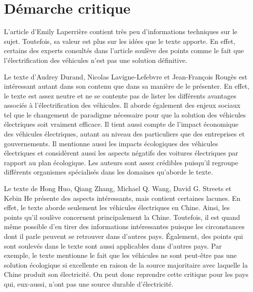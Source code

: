 
\chapter{Démarche critique}

L'article  d'Emily Laperrière contient très peu d'informations techniques sur le sujet. Toutefois, sa valeur est plus sur les idées que le texte apporte. En effet, certains des experts consultés dans l'article soulève des points comme le fait que l'électrification des véhicules n'est pas une solution définitive. 

Le texte  d'Audrey Durand, Nicolas Lavigne-Lefebvre et Jean-François Rougès est intéressant autant dans son contenu que dans sa manière de le présenter. En effet, le texte est assez neutre et ne se contente pas de lister les différents avantages associés à l'électrification des véhicules. Il aborde également des enjeux sociaux tel que le changement de paradigme nécessaire pour que la solution des véhicules électriques soit vraiment efficace. Il tient aussi compte de l'impact économique des véhicules électriques, autant au niveau des particuliers que des entreprises et gouvernements. Il mentionne aussi les impacts écologiques des véhicules électriques et considèrent aussi les aspects négatifs des voitures électriques par rapport au plan écologique. Les auteurs sont assez crédibles puisqu'il regroupe différents organismes spécialisés dans les domaines qu'aborde le texte.

Le texte  de Hong Huo, Qiang Zhang, Michael Q. Wang, David G. Streets et Kebin He présente des aspects intéressants, mais contient certaines lacunes. En effet, le texte aborde seulement les véhicules électriques en Chine. Ainsi, les points qu'il soulève concernent principalement la Chine. Toutefois, il est quand même possible d'en tirer des informations intéressantes puisque les circonstances dont il parle peuvent se retrouver dans d'autres pays. Également, des points qui sont soulevés dans le texte sont aussi applicables dans d'autres pays. Par exemple, le texte mentionne le fait que les véhicules ne sont peut-être pas une solution écologique si excellente en raison de la source majoritaire avec laquelle la Chine produit son électricité. On peut donc reprendre cette critique pour les pays qui, eux-aussi, n'ont pas une source durable d'électricité.

